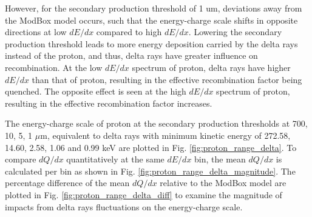 However, for the secondary production threshold of 1 um, deviations away from the ModBox model occurs, such that the energy-charge scale shifts in opposite directions at low $dE/dx$ compared to high $dE/dx$. 
Lowering the secondary production threshold leads to more energy deposition carried by the delta rays instead of the proton, and thus, delta rays have greater influence on recombination.
At the low $dE/dx$ spectrum of proton, delta rays have higher $dE/dx$ than that of proton, resulting in the effective recombination factor being quenched. 
The opposite effect is seen at the high $dE/dx$ spectrum of proton, resulting in the effective recombination factor increases.

The energy-charge scale of proton at the secondary production thresholds at 700, 10, 5, 1 $\mu$m, equivalent to delta rays with minimum kinetic energy of 272.58, 14.60, 2.58, 1.06 and 0.99 keV are plotted in Fig. \ref{fig:proton_range_delta}. 
To compare $dQ/dx$ quantitatively at the same $dE/dx$ bin, the mean $dQ/dx$ is calculated per bin as shown in Fig. \ref{fig:proton_range_delta_magnitude}.
The percentage difference of the mean $dQ/dx$ relative to the ModBox model are plotted in Fig. \ref{fig:proton_range_delta_diff} to examine the magnitude of impacts from delta rays fluctuations on the energy-charge scale. 
